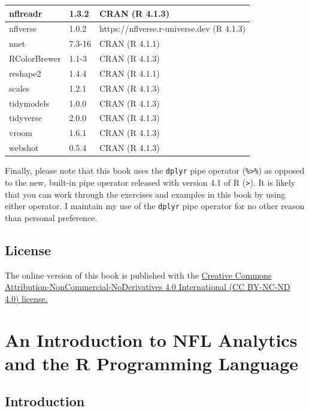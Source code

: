 \documentclass[
  letterpaper,
]{krantz}
\begin{document}
\begin{table}
\begin{tabular}[t]{l|l|l}
\hline
nflreadr & 1.3.2 & CRAN (R 4.1.3)\\
\hline
nflverse & 1.0.2 & https://nflverse.r-universe.dev (R 4.1.3)\\
\hline
nnet & 7.3-16 & CRAN (R 4.1.1)\\
\hline
RColorBrewer & 1.1-3 & CRAN (R 4.1.3)\\
\hline
reshape2 & 1.4.4 & CRAN (R 4.1.1)\\
\hline
scales & 1.2.1 & CRAN (R 4.1.3)\\
\hline
tidymodels & 1.0.0 & CRAN (R 4.1.3)\\
\hline
tidyverse & 2.0.0 & CRAN (R 4.1.3)\\
\hline
vroom & 1.6.1 & CRAN (R 4.1.3)\\
\hline
webshot & 0.5.4 & CRAN (R 4.1.3)\\
\hline
\end{tabular}
\end{table}

Finally, please note that this book uses the \texttt{dplyr} pipe
operator (\texttt{\%\textgreater{}\%}) as opposed to the new, built-in
pipe operator released with version 4.1 of R
(\texttt{\textbar{}\textgreater{}}). It is likely that you can work
through the exercises and examples in this book by using either
operator. I maintain my use of the \texttt{dplyr} pipe operator for no
other reason than personal preference.

\hypertarget{license}{%
\section{License}\label{license}}

The online version of this book is published with the
\href{https://creativecommons.org/licenses/by-nc-nd/4.0/}{Creative
Commons Attribution-NonCommercial-NoDerivatives 4.0 International (CC
BY-NC-ND 4.0) license.}


\hypertarget{an-introduction-to-nfl-analytics-and-the-r-programming-language}{%
\chapter{An Introduction to NFL Analytics and the R Programming
Language}\label{an-introduction-to-nfl-analytics-and-the-r-programming-language}}

\hypertarget{introduction-1}{%
\section{Introduction}\label{introduction-1}}
\end{document}
